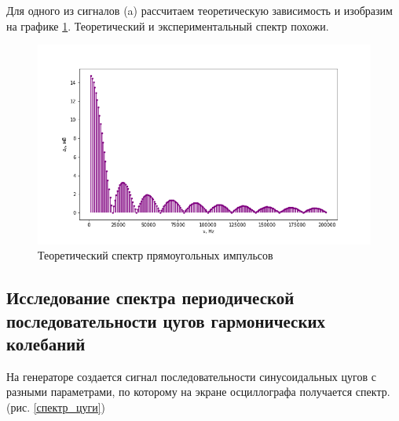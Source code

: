 \documentclass[a4paper,12pt]{article} %
\begin{document}
Для одного из сигналов (a) рассчитаем теоретическую зависимость и изобразим на графике \ref{теор}. Теоретический и экспериментальный спектр похожи.

\begin{figure}[h!]
\begin{center}
\includegraphics[width=\textwidth]{a(n)}
\caption{Теоретический спектр прямоугольных импульсов} \label{теор}
\end{center}
\end{figure}

\subsection{Исследование спектра периодической последовательности цугов гармонических колебаний}
На генераторе создается сигнал последовательности синусоидальных цугов с разными параметрами, по которому на экране осциллографа получается спектр. (рис. \ref{спектр_цуги})
\end{document}
